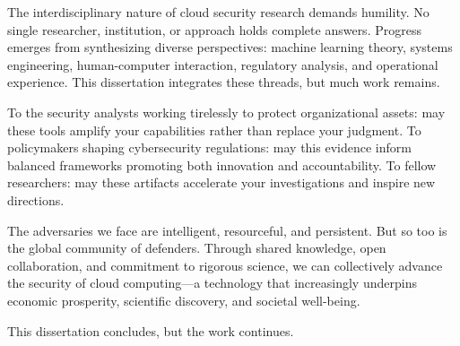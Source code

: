 The interdisciplinary nature of cloud security research demands humility. No single researcher, institution, or approach holds complete answers. Progress emerges from synthesizing diverse perspectives: machine learning theory, systems engineering, human-computer interaction, regulatory analysis, and operational experience. This dissertation integrates these threads, but much work remains.

To the security analysts working tirelessly to protect organizational assets: may these tools amplify your capabilities rather than replace your judgment. To policymakers shaping cybersecurity regulations: may this evidence inform balanced frameworks promoting both innovation and accountability. To fellow researchers: may these artifacts accelerate your investigations and inspire new directions.

The adversaries we face are intelligent, resourceful, and persistent. But so too is the global community of defenders. Through shared knowledge, open collaboration, and commitment to rigorous science, we can collectively advance the security of cloud computing—a technology that increasingly underpins economic prosperity, scientific discovery, and societal well-being.

This dissertation concludes, but the work continues.
